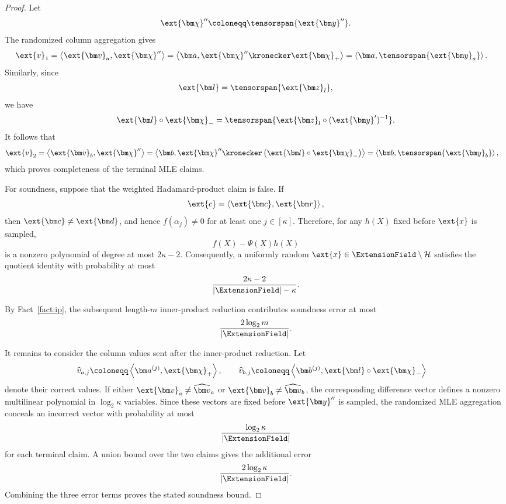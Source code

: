 \begin{proof}
Let
\[
    \ext{\bm\chi}''
    \coloneqq
    \tensorspan{\ext{\bm y}''}.
\]
The randomized column aggregation gives
\[
\begin{aligned}
    \ext{v}_1
    &=
    \left\langle
        \ext{\bm v}_a,\ext{\bm\chi}''
    \right\rangle
    =
    \left\langle
        \bm a,
        \ext{\bm\chi}''
        \kronecker
        \ext{\bm\chi}_+
    \right\rangle
    =
    \left\langle
        \bm a,
        \tensorspan{\ext{\bm y}_a}
    \right\rangle.
\end{aligned}
\]
Similarly, since
\[
    \ext{\bm l}
    =
    \tensorspan{\ext{\bm z}_l},
\]
we have
\[
    \ext{\bm l}\circ\ext{\bm\chi}_-
    =
    \tensorspan{
        \ext{\bm z}_l
        \circ
        (\ext{\bm y}')^{-1}
    }.
\]
It follows that
\[
\begin{aligned}
    \ext{v}_2
    &=
    \left\langle
        \ext{\bm v}_b,\ext{\bm\chi}''
    \right\rangle
    =
    \left\langle
        \bm b,
        \ext{\bm\chi}''
        \kronecker
        \left(
            \ext{\bm l}\circ\ext{\bm\chi}_-
        \right)
    \right\rangle
    =
    \left\langle
        \bm b,
        \tensorspan{\ext{\bm y}_b}
    \right\rangle,
\end{aligned}
\]
which proves completeness of the terminal MLE claims.

For soundness, suppose that the weighted Hadamard-product claim is
false. If
\[
    \ext{c}
    =
    \left\langle
        \ext{\bm c},\ext{\bm r}
    \right\rangle,
\]
then \(\ext{\bm c}\neq\ext{\bm d}\), and hence
\(f(\alpha_j)\neq0\) for at least one \(j\in[\kappa]\). Therefore, for
any \(h(X)\) fixed before \(\ext{x}\) is sampled,
\[
    f(X)-\Psi(X)h(X)
\]
is a nonzero polynomial of degree at most \(2\kappa-2\).
Consequently, a uniformly random
\(\ext{x}\in\ExtensionField\setminus\mathcal H\) satisfies the
quotient identity with probability at most
\[
    \frac{2\kappa-2}
         {|\ExtensionField|-\kappa}.
\]

By Fact~\ref{fact:ip}, the subsequent length-\(m\)
inner-product reduction contributes soundness error at most
\[
    \frac{2\log_2m}
         {|\ExtensionField|}.
\]

It remains to consider the column values sent after the
inner-product reduction. Let
\[
\begin{aligned}
    \widehat v_{a,j}
    &\coloneqq
    \left\langle
        \bm a^{(j)},\ext{\bm\chi}_+
    \right\rangle,
    \qquad
    \widehat v_{b,j}
    \coloneqq
    \left\langle
        \bm b^{(j)},
        \ext{\bm l}\circ\ext{\bm\chi}_-
    \right\rangle
\end{aligned}
\]
denote their correct values. If either
\(\ext{\bm v}_a\neq\widehat{\bm v}_a\) or
\(\ext{\bm v}_b\neq\widehat{\bm v}_b\), the corresponding
difference vector defines a nonzero multilinear polynomial in
\(\log_2\kappa\) variables. Since these vectors are fixed before
\(\ext{\bm y}''\) is sampled, the randomized MLE aggregation
conceals an incorrect vector with probability at most
\[
    \frac{\log_2\kappa}{|\ExtensionField|}
\]
for each terminal claim. A union bound over the two claims gives
the additional error
\[
    \frac{2\log_2\kappa}{|\ExtensionField|}.
\]
Combining the three error terms proves the stated soundness bound.


\end{proof}
